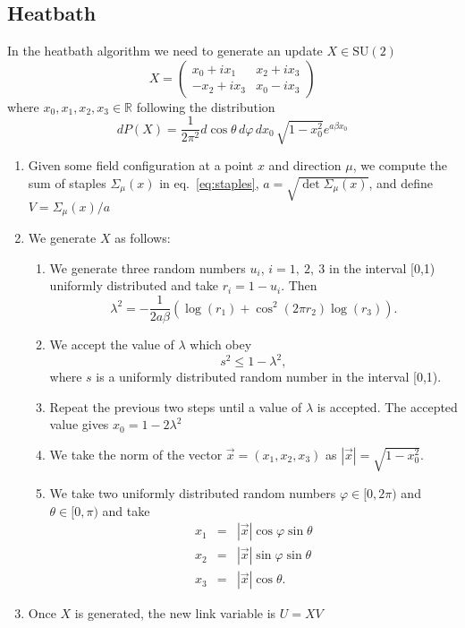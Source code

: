 \documentclass[12pt,a4paper]{article}
\begin{document}
\subsection{Heatbath}\label{sec:heatbath}
In the heatbath algorithm we need to generate an update $X\in\text{SU}(2)$
	 \begin{equation}
	 	X = \begin{pmatrix}
	 		 x_0 + ix_1 & x_2 + ix_3 \\
	 		-x_2 + ix_3 & x_0 - ix_3
	 	\end{pmatrix}
	 \end{equation}
	 where $x_0, x_1, x_2,x_3 \in \mathbb{R}$
 following the distribution
\begin{equation}
	dP(X) = \frac{1}{2\pi^2} d\cos\theta\, d\varphi\, dx_0\, \sqrt{1-x_0^2}e^{a\beta x_0}
\end{equation}
\begin{enumerate}
\item Given some field configuration at a point $x$ and direction $\mu$, we compute the sum of staples $\Sigma_{\mu}(x)$ in eq.\ \eqref{eq:staples}, $a = \sqrt{\det \Sigma_{\mu}(x)}$, and define $V = \Sigma_{\mu}(x)/a$
	\item We generate $X$ as follows:
	\begin{enumerate}
	\item	We generate three random numbers $u_i$, $i = 1,\ 2,\ 3$ in the interval [0,1) uniformly distributed and take $r_i = 1 - u_i$. Then
		 \begin{equation}
		 	\lambda^2 = -\frac{1}{2a\beta}\left(\log(r_1) + \cos^2(2\pi r_2)\log(r_3)\right).
		 \end{equation}
	\item We accept the value of $\lambda$ which obey
		\begin{equation}
			s^2 \leq 1- \lambda^2,
		\end{equation}
		where $s$ is a uniformly distributed random number in the interval [0,1).
	\item Repeat the previous two steps until a value of $\lambda$ is accepted. The accepted value gives $x_0 = 1 - 2\lambda^2$
	\item We take the norm of the vector $\vec{x} = (x_1,x_2,x_3)$ as $|\vec{x}| = \sqrt{1 - x_0^2}$.
	\item We take two uniformly distributed random numbers $\varphi\in [0,2\pi)$ and $\theta \in [0,\pi)$ and take
	\begin{eqnarray}
		x_1 & = & |\vec{x}| \cos\varphi \sin\theta \\
		x_2 & = & |\vec{x}| \sin\varphi \sin\theta \\
		x_3 & = & |\vec{x}| \cos\theta	.
	\end{eqnarray}		
	  
	\end{enumerate}
	\item Once $X$ is generated, the new link variable is $U = X V$
\end{enumerate}
\end{document}

